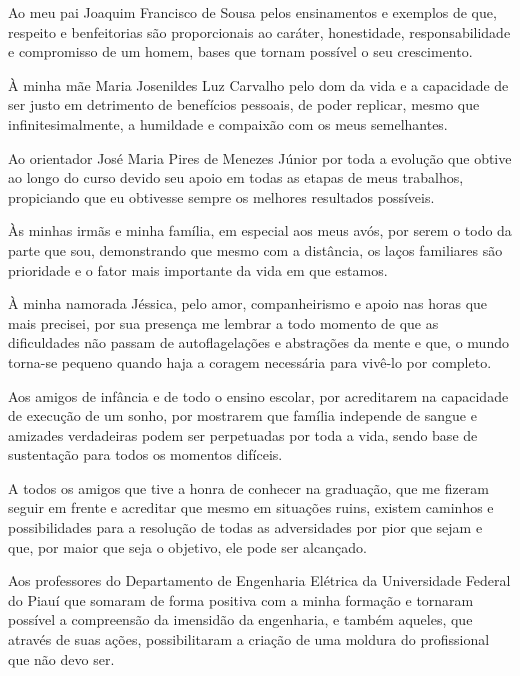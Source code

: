 Ao meu pai Joaquim Francisco de Sousa pelos ensinamentos e exemplos de que, respeito e benfeitorias são proporcionais ao caráter, honestidade, responsabilidade e compromisso de um homem, bases que tornam possível o seu crescimento.
    
À minha mãe Maria Josenildes Luz Carvalho pelo dom da vida e a capacidade de ser justo em detrimento de benefícios pessoais, de poder replicar, mesmo que infinitesimalmente, a humildade e compaixão com os meus semelhantes.
    
Ao orientador José Maria Pires de Menezes Júnior por toda a evolução que obtive ao longo do curso devido seu apoio em todas as etapas de meus trabalhos, propiciando que eu obtivesse sempre os melhores resultados possíveis.
    
Às minhas irmãs e minha família, em especial aos meus avós, por serem o todo da parte que sou, demonstrando que mesmo com a distância, os laços familiares são prioridade e o fator mais importante da vida em que estamos.
    
À minha namorada Jéssica, pelo amor, companheirismo e apoio nas horas que mais precisei, por sua presença me lembrar a todo momento de que as dificuldades não passam de autoflagelações e abstrações da mente e que, o mundo torna-se pequeno quando haja a coragem necessária para vivê-lo por completo.
    
Aos amigos de infância e de todo o ensino escolar, por acreditarem na capacidade de execução de um sonho, por mostrarem que família independe de sangue e amizades verdadeiras podem ser perpetuadas por toda a vida, sendo base de sustentação para todos os momentos difíceis.
    
A todos os amigos que tive a honra de conhecer na graduação, que me fizeram seguir em frente e acreditar que mesmo em situações ruins, existem caminhos e possibilidades para a resolução de todas as adversidades por pior que sejam e que, por maior que seja o objetivo, ele pode ser alcançado.
    
Aos professores do Departamento de Engenharia Elétrica da Universidade Federal do Piauí que somaram de forma positiva com a minha formação e tornaram possível a compreensão da imensidão da engenharia, e também aqueles, que através de suas ações, possibilitaram a criação de uma moldura do profissional que não devo ser.